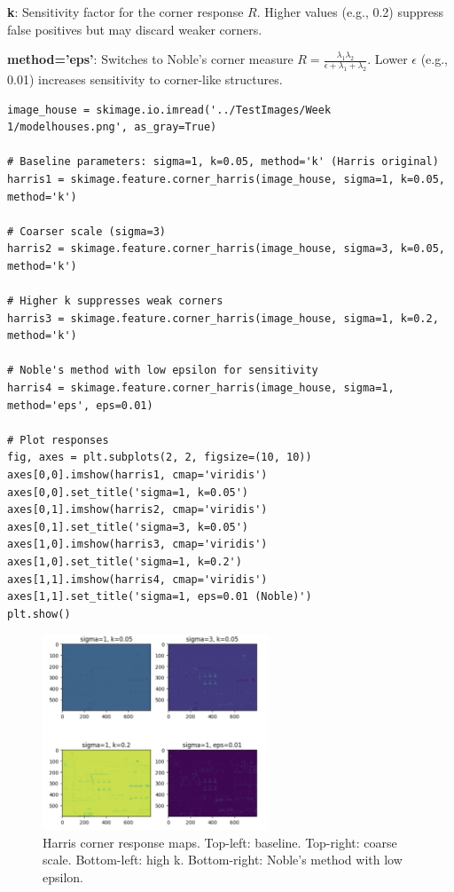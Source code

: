 \documentclass[12pt]{article}
\begin{document}
\textbf{k}: Sensitivity factor for the corner response \( R \). Higher values (e.g., 0.2) suppress false positives but may discard weaker corners. 

\textbf{method='eps'}: Switches to Noble’s corner measure \( R = \frac{\lambda_1 \lambda_2}{\epsilon + \lambda_1 + \lambda_2} \). Lower \(\epsilon\) (e.g., 0.01) increases sensitivity to corner-like structures.

\begin{lstlisting}
image_house = skimage.io.imread('../TestImages/Week 1/modelhouses.png', as_gray=True)

# Baseline parameters: sigma=1, k=0.05, method='k' (Harris original)
harris1 = skimage.feature.corner_harris(image_house, sigma=1, k=0.05, method='k')

# Coarser scale (sigma=3)
harris2 = skimage.feature.corner_harris(image_house, sigma=3, k=0.05, method='k')

# Higher k suppresses weak corners
harris3 = skimage.feature.corner_harris(image_house, sigma=1, k=0.2, method='k')

# Noble's method with low epsilon for sensitivity
harris4 = skimage.feature.corner_harris(image_house, sigma=1, method='eps', eps=0.01)

# Plot responses
fig, axes = plt.subplots(2, 2, figsize=(10, 10))
axes[0,0].imshow(harris1, cmap='viridis')
axes[0,0].set_title('sigma=1, k=0.05')
axes[0,1].imshow(harris2, cmap='viridis')
axes[0,1].set_title('sigma=3, k=0.05')
axes[1,0].imshow(harris3, cmap='viridis')
axes[1,0].set_title('sigma=1, k=0.2')
axes[1,1].imshow(harris4, cmap='viridis')
axes[1,1].set_title('sigma=1, eps=0.01 (Noble)')
plt.show()
\end{lstlisting}

\begin{figure}[h]
    \centering
    \includegraphics[width=0.6\textwidth]{pics/a5-3.2} 
    \caption{Harris corner response maps. Top-left: baseline. Top-right: coarse scale. Bottom-left: high k. Bottom-right: Noble’s method with low epsilon.}
\end{figure}
\end{document}
